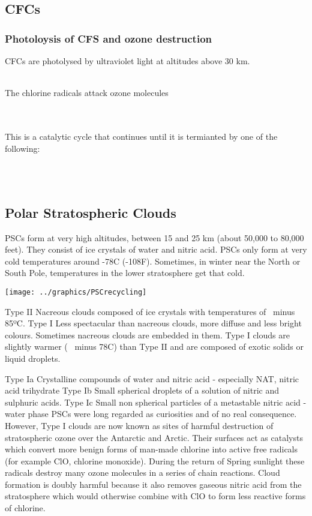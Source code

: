 \documentclass[a4paper,12pt,titlepage]{article}
\begin{document}
\subsection{CFCs}
\begin{frame}
\frametitle{Photoloysis of CFS and ozone destruction}
CFCs are photolysed by ultraviolet light at altitudes above 30 km.

\hfill\\
\medskip The chlorine radicals attack ozone molecules\newline

\hfill\\
\hfill\\
\medskip This is a catalytic cycle that continues until it is termianted by one of the following:

\medskip {}\hfill\\
\medskip {}\hfill\\
\end{frame}

\subsection{Polar Stratospheric Clouds}
\begin{frame}
PSCs form at very high altitudes, between 15 and 25 km (about 50,000 to 80,000 feet). They consist of ice crystals of water and nitric acid. PSCs only form at very cold temperatures around -78C (-108F). Sometimes, in winter near the North or South Pole, temperatures in the lower stratosphere get that cold. 

\texttt{[image: ../graphics/PSCrecycling]}
\end{frame}

Type II
Nacreous clouds composed of ice crystals with temperatures of ~minus 85ºC.
Type I
Less spectacular than nacreous clouds, more diffuse and less bright colours. Sometimes nacreous clouds are embedded in them. Type I clouds are slightly warmer (~ minus 78C) than Type II and are composed of exotic solids or liquid droplets.

Type Ia
Crystalline compounds of water and nitric acid - especially NAT, nitric acid trihydrate 
Type Ib
Small spherical droplets of a solution of nitric and sulphuric acids.
Type Ic
Small non spherical particles of a metastable nitric acid - water phase
PSCs were long regarded as curiosities and of no real consequence. However, Type I clouds are now known as sites of harmful destruction of stratospheric ozone over the Antarctic and Arctic. Their surfaces act as catalysts which convert more benign forms of man-made chlorine into active free radicals (for example ClO, chlorine monoxide). During the return of Spring sunlight these radicals destroy many ozone molecules in a series of chain reactions. Cloud formation is doubly harmful because it also removes gaseous nitric acid from the stratosphere which would otherwise combine with ClO to form less reactive forms of chlorine.
\end{document}

